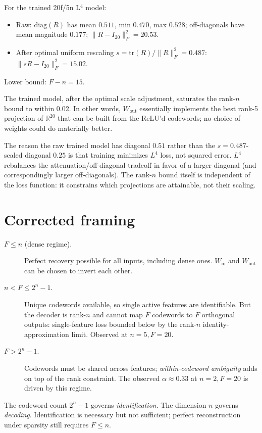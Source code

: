 \documentclass[11pt]{article}
\begin{document}
For the trained 20f/5n L$^4$ model:
\begin{itemize}
\item Raw: $\mathrm{diag}(R)$ has mean $0.511$, min $0.470$, max $0.528$; off-diagonals have mean magnitude $0.177$; $\|R - I_{20}\|_F^2 = 20.53$.
\item After optimal uniform rescaling $s = \mathrm{tr}(R) / \|R\|_F^2 = 0.487$: $\|sR - I_{20}\|_F^2 = 15.02$.
\end{itemize}
Lower bound: $F - n = 15$.

The trained model, after the optimal scale adjustment, saturates the rank-$n$ bound to within 0.02. In other words, $W_{\mathrm{out}}$ essentially implements the best rank-5 projection of $\mathbb{R}^{20}$ that can be built from the ReLU'd codewords; no choice of weights could do materially better.

The reason the raw trained model has diagonal $0.51$ rather than the $s = 0.487$-scaled diagonal $0.25$ is that training minimizes $L^4$ loss, not squared error. $L^4$ rebalances the attenuation/off-diagonal tradeoff in favor of a larger diagonal (and correspondingly larger off-diagonals). The rank-$n$ bound itself is independent of the loss function: it constrains which projections are attainable, not their scaling.

\section{Corrected framing}

\begin{description}
\item[$F \leq n$ (dense regime).] Perfect recovery possible for all inputs, including dense ones. $W_{\mathrm{in}}$ and $W_{\mathrm{out}}$ can be chosen to invert each other.
\item[$n < F \leq 2^n - 1$.] Unique codewords available, so single active features are identifiable. But the decoder is rank-$n$ and cannot map $F$ codewords to $F$ orthogonal outputs: single-feature loss bounded below by the rank-$n$ identity-approximation limit. Observed at $n = 5, F = 20$.
\item[$F > 2^n - 1$.] Codewords must be shared across features; \emph{within-codeword ambiguity} adds on top of the rank constraint. The observed $\alpha \approx 0.33$ at $n = 2, F = 20$ is driven by this regime.
\end{description}

The codeword count $2^n - 1$ governs \emph{identification}. The dimension $n$ governs \emph{decoding}. Identification is necessary but not sufficient; perfect reconstruction under sparsity still requires $F \leq n$.
\end{document}
